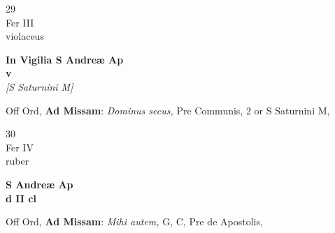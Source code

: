 \documentclass[10pt, openany]{book}
\begin{document}
        \begin{center}
            \begin{minipage}{3.5in}
                \vspace{2em}
                \begin{minipage}{0.5in}
                    {\Huge 29} \\
                    {\normalsize Fer III} \\
                    {\normalsize violaceus}
                \end{minipage}
                \begin{minipage}{3.0in}
                    \textbf{ \large In Vigilia S Andreæ Ap \\
                    \textnormal{\normalsize v}} \\ \textit{[S Saturnini M]} \\ 
                \end{minipage}
                \begin{justify}Off Ord, \textbf{Ad Missam}: \textit{Dominus secus,} Pre Communis, 2 or S Saturnini M,  
                \end{justify}
            \end{minipage}
        \end{center}
    
        \begin{center}
            \begin{minipage}{3.5in}
                \vspace{2em}
                \begin{minipage}{0.5in}
                    {\Huge 30} \\
                    {\normalsize Fer IV} \\
                    {\normalsize ruber}
                \end{minipage}
                \begin{minipage}{3.0in}
                    \textbf{ \large S Andreæ Ap \\
                    \textnormal{\normalsize d II cl}} \\ 
                \end{minipage}
                \begin{justify}Off Ord, \textbf{Ad Missam}: \textit{Mihi autem,} G, C, Pre de Apostolis,  
                \end{justify}
            \end{minipage}
        \end{center}
    
\end{document}
